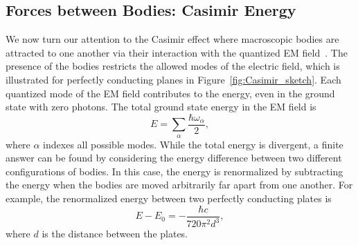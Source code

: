 

\subsection{Forces between Bodies: Casimir Energy}

We now turn our attention to the Casimir effect where macroscopic bodies are attracted to 
one another via their interaction with the quantized EM field~\citep{Casimir1948}.  
The presence of the bodies restricts the allowed modes of the electric field, 
which is illustrated for perfectly conducting planes in Figure~\ref{fig:Casimir_sketch}.
Each quantized mode of the EM field contributes
to the energy, even in the ground state with zero photons.
The total ground state energy in the EM field is 
\begin{equation}
  E=\sum_\alpha\frac{\hbar\omega_{\alpha}}{2},
\end{equation}
where $\alpha$ indexes all possible modes.  
While the total energy is divergent, a finite answer can be found by considering 
the energy difference between two different configurations of bodies.  
In this case, the energy is renormalized by subtracting the energy when the bodies are moved arbitrarily far apart
from one another.  
For example, the renormalized energy between two perfectly conducting plates is
\begin{equation}
  E-E_0 = -\frac{\hbar c}{720\pi^2 d^3},\label{eq:Casimir_energy}
\end{equation}
where $d$ is the distance between the plates.  %

